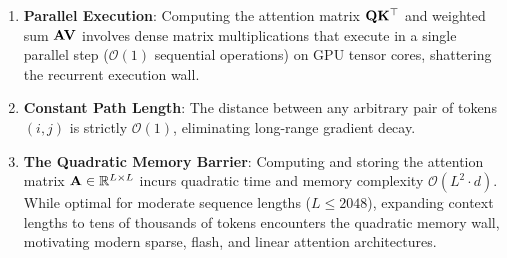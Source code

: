 \documentclass[../../../main.tex]{subfiles}
\begin{document}
\begin{enumerate}
    \item \textbf{Parallel Execution}: Computing the attention matrix $\mathbf{Q} \mathbf{K}^\top$ and weighted sum $\mathbf{A} \mathbf{V}$ involves dense matrix multiplications that execute in a single parallel step ($\mathcal{O}(1)$ sequential operations) on GPU tensor cores, shattering the recurrent execution wall.
    \item \textbf{Constant Path Length}: The distance between any arbitrary pair of tokens $(i, j)$ is strictly $\mathcal{O}(1)$, eliminating long-range gradient decay.
    \item \textbf{The Quadratic Memory Barrier}: Computing and storing the attention matrix $\mathbf{A} \in \mathbb{R}^{L \times L}$ incurs quadratic time and memory complexity $\mathcal{O}(L^2 \cdot d)$. While optimal for moderate sequence lengths ($L \le 2048$), expanding context lengths to tens of thousands of tokens encounters the quadratic memory wall, motivating modern sparse, flash, and linear attention architectures.
\end{enumerate}

\clearpage
\thispagestyle{empty}
\null
\clearpage
\end{document}
